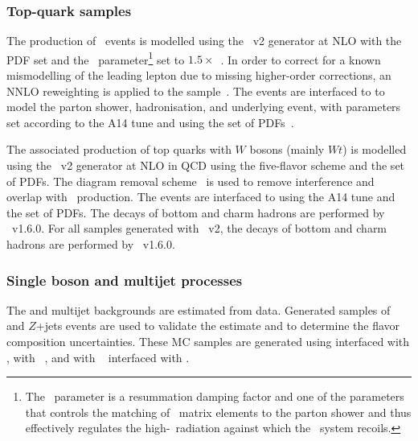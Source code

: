 \subsubsection{Top-quark samples}

The production of \ttbar\ events is modelled using the \powhegbox~v2 generator at NLO with the \nnpdfnlo PDF set and the \hdamp\ parameter\footnote{The \hdamp\ parameter is a resummation damping factor and one of the parameters that controls the matching of \Powheg\ matrix elements to the parton shower and thus effectively regulates the high-\pt\ radiation against which the \ttbar\ system recoils.} set to $1.5\times$\mtop~\cite{ATL-PHYS-PUB-2016-020}.
In order to correct for a known mismodelling of the leading lepton \pt due to missing higher-order corrections, an NNLO reweighting is applied to the sample~\cite{NNLOReweighting}.
The events are interfaced to  to model the parton shower, hadronisation, and underlying event, with parameters set according to the A14 tune and using the \nnpdftwo set of PDFs~\cite{Ball:2012cx}.

The associated production of top quarks with $W$ bosons (mainly $Wt$) is modelled using the \powhegbox~v2 generator at NLO in QCD using the five-flavor scheme and the \nnpdfnlo set of PDFs.
The diagram removal scheme~\cite{Frixione:2008yi} is used to remove interference and overlap with \ttbar\ production.
The events are interfaced to  using the A14 tune and the \nnpdftwo set of PDFs.
The decays of bottom and charm hadrons are performed by \evtgen~v1.6.0.
For all samples generated with \powhegbox~v2, the decays of bottom and charm hadrons are performed by \evtgen~v1.6.0.

\subsubsection{Single boson and multijet processes}

The \Wjets and multijet backgrounds are estimated from data. Generated samples of \Wjets and $Z$+jets events are used to validate the estimate and to determine the flavor composition uncertainties. These MC samples are generated using \POWHEG interfaced with , with ~\cite{Bothmann:2019yzt}, and with \MGFiveNLO~\cite{Alwall:2014hca,Frederix:2012ps} interfaced with .

